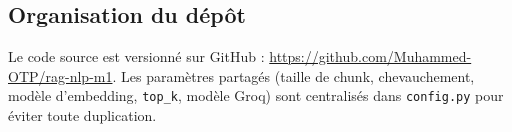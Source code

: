 \subsection{Organisation du d\'ep\^ot}

Le code source est versionn\'e sur GitHub :
\url{https://github.com/Muhammed-OTP/rag-nlp-m1}. Les param\`etres partag\'es (taille de chunk,
chevauchement, mod\`ele d'embedding, \texttt{top\_k}, mod\`ele Groq) sont centralis\'es dans
\texttt{config.py} pour \'eviter toute duplication.
